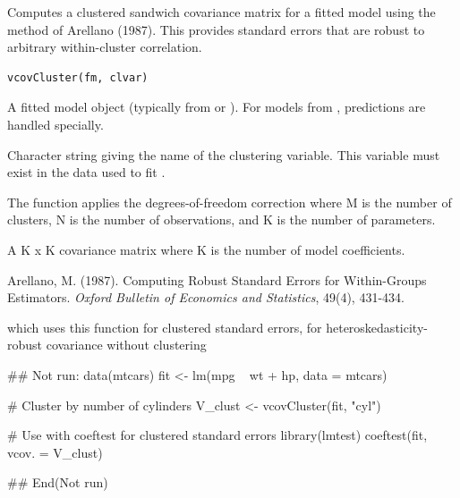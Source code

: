 \documentclass[a4paper]{book}
\begin{document}
%
\begin{Description}
Computes a clustered sandwich covariance matrix for a fitted model using the
method of Arellano (1987). This provides standard errors that are robust to
arbitrary within-cluster correlation.
\end{Description}
%
\begin{Usage}
\begin{verbatim}
vcovCluster(fm, clvar)
\end{verbatim}
\end{Usage}
%
\begin{Arguments}
\begin{ldescription}
\item[\code{fm}] A fitted model object (typically from  or ).
For  models from , predictions are handled specially.

\item[\code{clvar}] Character string giving the name of the clustering variable.
This variable must exist in the data used to fit .
\end{ldescription}
\end{Arguments}
%
\begin{Details}
The function applies the degrees-of-freedom correction
 where M is
the number of clusters, N is the number of observations, and K is the number
of parameters.
\end{Details}
%
\begin{Value}
A K x K covariance matrix where K is the number of model coefficients.
\end{Value}
%
\begin{References}
Arellano, M. (1987). Computing Robust Standard Errors for Within-Groups
Estimators. \emph{Oxford Bulletin of Economics and Statistics}, 49(4), 431-434.
\end{References}
%
\begin{SeeAlso}
 which uses this function for clustered
standard errors,  for heteroskedasticity-robust
covariance without clustering
\end{SeeAlso}
%
\begin{Examples}
\begin{ExampleCode}
## Not run: 
data(mtcars)
fit <- lm(mpg ~ wt + hp, data = mtcars)

# Cluster by number of cylinders
V_clust <- vcovCluster(fit, "cyl")

# Use with coeftest for clustered standard errors
library(lmtest)
coeftest(fit, vcov. = V_clust)

## End(Not run)

\end{ExampleCode}
\end{Examples}
\end{document}
